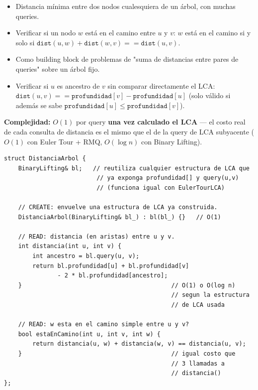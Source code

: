 \documentclass[10pt,a4paper,twocolumn]{article}
\begin{document}
\begin{itemize}
    \item Distancia mínima entre dos nodos cualesquiera de un árbol,
    con muchas queries.
    \item Verificar si un nodo $w$ está en el camino entre $u$ y $v$:
    $w$ está en el camino si y solo si
    $\texttt{dist}(u,w) + \texttt{dist}(w,v) == \texttt{dist}(u,v)$.
    \item Como building block de problemas de "suma de distancias
    entre pares de queries" sobre un árbol fijo.
    \item Verificar si $u$ es ancestro de $v$ sin comparar
    directamente el LCA: $\texttt{dist}(u,v) ==
    \texttt{profundidad}[v] - \texttt{profundidad}[u]$ (solo válido
    si además se sabe $\texttt{profundidad}[u] \le
    \texttt{profundidad}[v]$).
\end{itemize}

\textbf{Complejidad:} $O(1)$ por query \textbf{una vez calculado el
LCA} — el costo real de cada consulta de distancia es el mismo que el
de la query de LCA subyacente ($O(1)$ con Euler Tour + RMQ, $O(\log
n)$ con Binary Lifting).

\begin{lstlisting}[style=cpp]
struct DistanciaArbol {
    BinaryLifting& bl;   // reutiliza cualquier estructura de LCA que
                          // ya exponga profundidad[] y query(u,v)
                          // (funciona igual con EulerTourLCA)

    // CREATE: envuelve una estructura de LCA ya construida.
    DistanciaArbol(BinaryLifting& bl_) : bl(bl_) {}   // O(1)

    // READ: distancia (en aristas) entre u y v.
    int distancia(int u, int v) {
        int ancestro = bl.query(u, v);
        return bl.profundidad[u] + bl.profundidad[v]
               - 2 * bl.profundidad[ancestro];
    }                                          // O(1) o O(log n)
                                               // segun la estructura
                                               // de LCA usada

    // READ: w esta en el camino simple entre u y v?
    bool estaEnCamino(int u, int v, int w) {
        return distancia(u, w) + distancia(w, v) == distancia(u, v);
    }                                          // igual costo que
                                               // 3 llamadas a
                                               // distancia()
};
\end{lstlisting}
\end{document}
